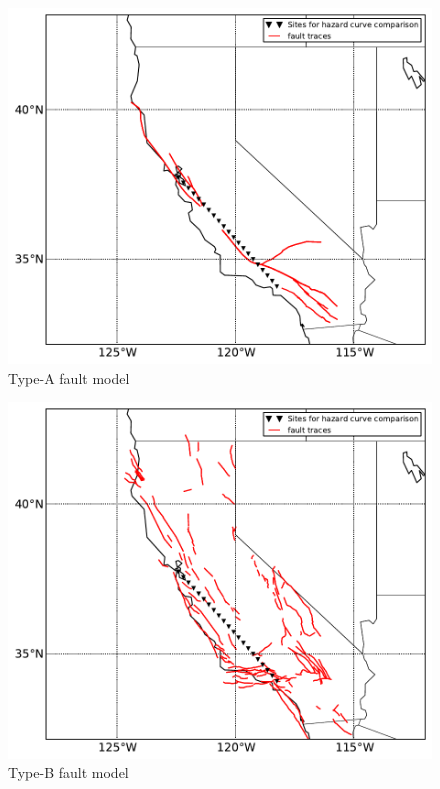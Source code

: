 \begin{figure}[!ht]
\centering
\includegraphics[width=12cm]{./qareport/pictures/aFault_aPriori_D2pt1.pdf}
\caption{Type-A fault model}
\label{fig:type_a_fault}
\end{figure}

\begin{figure}[!hb]
\centering
\includegraphics[width=12cm]{./qareport/pictures/bFault_stitched_D2pt1_GR0.pdf}
\caption{Type-B fault model}
\label{fig:type_b_fault}
\end{figure}

